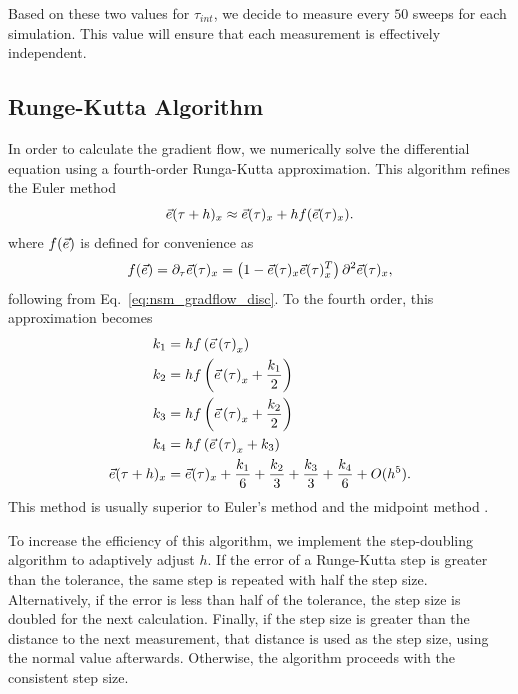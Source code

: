 Based on these two values for $\tau_{int}$, we decide to measure every $50$ sweeps for each simulation. This value will ensure that each measurement is effectively independent.

\subsection{Runge-Kutta Algorithm}
In order to calculate the gradient flow, we numerically solve the differential equation using a fourth-order Runga-Kutta approximation. This algorithm refines the Euler method 
\begin{equation*}
    \vec e(\tau+h)_x \approx \vec e(\tau)_x + h f(\vec e(\tau)_x).
\end{equation*}
where $f(\vec e)$ is defined for convenience as 
\begin{equation}
    f(\vec e)=\partial_\tau \vec e (\tau)_x  = \left( 1 - \vec e(\tau)_x \vec e(\tau)_x^T\right) \partial^2 \vec e(\tau)_x,
\end{equation}
following from Eq.~\ref{eq:nsm_gradflow_disc}. To the fourth order, this approximation becomes 
%
\begin{align}
    \label{eq:rungekutta}
    k_1 &= h f\left(\vec e\left(\tau\right)_x\right) \\ 
    k_2 &= h f\left(\vec e\left(\tau\right)_x + \frac{k_1}{2}\right) \\ 
    k_3 &= h f\left(\vec e\left(\tau\right)_x + \frac{k_2}{2}\right) \\ 
    k_4 &= h f\left(\vec e\left(\tau\right)_x + k_3\right) \\ 
    \vec e(\tau+h)_x &= \vec e(\tau)_x + \frac{k_1}{6} + \frac{k_2}{3} + \frac{k_3}{3} + \frac{k_4}{6} + O(h^5).
\end{align}
This method is usually superior to Euler's method and the midpoint method \cite{vetterling1992}.

To increase the efficiency of this algorithm, we implement the step-doubling algorithm to adaptively adjust $h$. If the error of a Runge-Kutta step is greater than the tolerance, the same step is repeated with half the step size. Alternatively, if the error is less than half of the tolerance, the step size is doubled for the next calculation. Finally, if the step size is greater than the distance to the next measurement, that distance is used as the step size, using the normal value afterwards. Otherwise, the algorithm proceeds with the consistent step size. 


